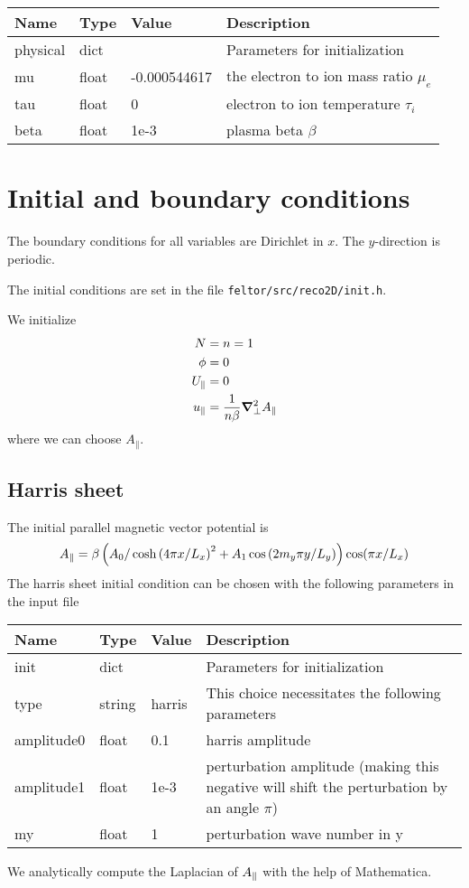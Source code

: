 \begin{longtable}{llll}
\toprule
\rowcolor{gray!50}\textbf{Name} &  \textbf{Type} & \textbf{Value}  & \textbf{Description}  \\ \midrule
physical &  dict &   & Parameters for initialization \\
\qquad mu      & float & -0.000544617 & the electron to ion mass ratio $\mu_e$ \\
\qquad tau  & float &  0    &  electron to ion temperature $\tau_i$ \\
\qquad beta  & float &  1e-3    &  plasma beta $\beta$ \\
\bottomrule
\end{longtable}

\section{Initial and boundary conditions}
The boundary conditions for all variables are Dirichlet in $x$.
The $y$-direction is periodic.

The initial conditions are set in the file \texttt{feltor/src/reco2D/init.h}.

We initialize
\begin{align}
 N&=n =1 \\
 \phi &= 0 \\
  U_\parallel&=0 \\
  u_\parallel &= \frac{1}{n  \beta }{\boldsymbol{\nabla}}^2_{\perp} A_\parallel
\end{align}
where we can choose $A_\parallel$.
\subsection{Harris sheet}
The initial parallel magnetic vector potential is
\begin{align}
    A_\parallel =\beta\left( A_0 / \cosh{( 4  \pi x / L_x )}^2 +A_1\cos{(2 m_y\pi y/L_y)}\right) \cos( \pi x /L_x)
\end{align}
The harris sheet initial condition can be chosen with the following parameters in the input file
\begin{longtable}{llll}
\toprule
\rowcolor{gray!50}\textbf{Name} &  \textbf{Type} & \textbf{Value}  & \textbf{Description}  \\ \midrule
init &  dict &   & Parameters for initialization \\
\qquad type      & string & harris & This choice necessitates the following parameters \\
\qquad amplitude0  & float &  0.1     &  harris amplitude \\
\qquad amplitude1  & float &  1e-3    &  perturbation amplitude (making this negative will shift the perturbation by an angle $\pi$) \\
\qquad my          & float &  1       &  perturbation wave number in y\\
\bottomrule
\end{longtable}
We analytically compute the Laplacian of $A_\parallel$ with the help of Mathematica.

